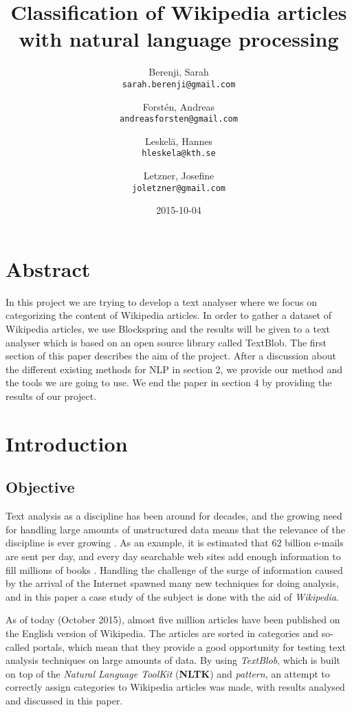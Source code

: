 \documentclass[a4paper]{article}
\title{Classification of Wikipedia articles with natural language processing}
\author{
  Berenji, Sarah\\
  \texttt{sarah.berenji@gmail.com}
  \and
  Forstén, Andreas\\
  \texttt{andreasforsten@gmail.com}
  \and
  Leskelä, Hannes\\
  \texttt{hleskela@kth.se}
  \and
  Letzner, Josefine\\
    \texttt{joletzner@gmail.com}
}
\date{2015-10-04}
\begin{document}
\maketitle
\section*{Abstract}
In this project we are trying to develop a text analyser where we focus on categorizing the content of Wikipedia articles. In order to gather a dataset of Wikipedia articles, we use Blockspring and the results will be given to a text analyser which is based on an open source library called TextBlob. The first section of this paper describes the aim of the project. After a discussion about the different existing methods for NLP in section 2, we provide our method and the tools we are going to use. We end the paper in section 4 by providing the results of our project.


\newpage
\tableofcontents
\newpage

\section{Introduction}


\vspace{3mm}

\subsection{Objective}

Text analysis as a discipline has been around for decades, and the growing need for handling large amounts of unstructured data means that the relevance of the discipline is ever growing \cite{HistoryofTextAnalytics}. As an example, it is estimated that 62 billion e-mails are sent per day, and every day searchable web sites add enough information to fill millions of books \cite{ChallengesInTextAnalytics}. Handling the challenge of the surge of information caused by the arrival of the Internet spawned many new techniques for doing analysis, and in this paper a case study of the subject is done with the aid of \textit{Wikipedia}. 

\vspace{3mm}

As of today (October 2015), almost five million articles have been published on the English version of Wikipedia\cite{wikipedia}. The articles are sorted in categories and so-called portals, which mean that they provide a good opportunity for testing text analysis techniques on large amounts of data. By using \textit{TextBlob}, which is built on top of the \textit{Natural Language ToolKit} (\textbf{NLTK}) and \textit{pattern}\cite{textblob}, an attempt to correctly assign categories to Wikipedia articles was made, with results analysed and discussed in this paper. 
\end{document}
